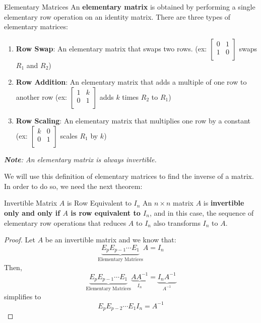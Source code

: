 \documentclass{article}
\begin{document}
\begin{definition}{Elementary Matrices}
	An \textbf{elementary matrix} is obtained by performing a single elementary row operation on an identity matrix. There are three types of elementary matrices:

	\begin{enumerate}
		\item
		      \textbf{Row Swap}: An elementary matrix that swaps two rows. (ex: $\begin{bmatrix}
				      0 & 1 \\
				      1 & 0 \\
			      \end{bmatrix}$ swaps $R_1$ and $R_2$)
		\item
		      \textbf{Row Addition}: An elementary matrix that adds a multiple of one row to another row (ex: $\begin{bmatrix}
				      1 & k \\
				      0 & 1 \\
			      \end{bmatrix}$ adds $k$ times $R_2$ to $R_1$)
		\item
		      \textbf{Row Scaling}: An elementary matrix that multiplies one row by a constant (ex: $\begin{bmatrix}
				      k & 0 \\
				      0 & 1 \\
			      \end{bmatrix}$ scales $R_1$ by $k$)
	\end{enumerate}

	\emph{\textbf{Note}: An elementary matrix is always invertible.}
\end{definition}
We will use this definition of elementary matrices to find the inverse of a matrix. In order to do so, we need the next theorem:
\begin{theorem}{Invertible Matrix $A$ is Row Equivalent to $I_n$}
	An $n \times n$ matrix $A$ is \textbf{invertible only and only if $A$ is row equivalent to $I_n$}, and in this case, the sequence of elementary row operations that reduces $A$ to $I_n$ also transforms $I_n$ to $A$.

\end{theorem}
\begin{proof}{}
	Let $A$ be an invertible matrix and we know that:
	$$
		\underbrace{E_{p} E_{p - 1} \cdots E_1}_{\text{Elementary Matrices}}A = I_n
	$$
	Then,
	$$
		\underbrace{E_{p} E_{p - 1} \cdots E_1}_{\text{Elementary Matrices}} \underbrace{A A^{-1}}_{I_n} = \underbrace{I_n A^{-1}}_{A^{-1}}
	$$
	simplifies to
	$$
		E_p E_{p - 2} \cdots E_1 I_n = A^{-1}
	$$
\end{proof}
\end{document}
